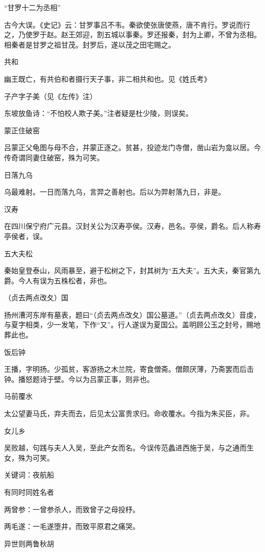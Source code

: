 \documentclass[a4paper,12pt,UTF8,twoside]{ctexbook}
\begin{document}
    “甘罗十二为丞相”
    
    古今大误。《史记》云：甘罗事吕不韦。秦欲使张唐使燕，唐不肯行。罗说而行之，乃使罗于赵。赵王郊迎，割五城以事秦。罗还报秦，封为上卿，不曾为丞相。相秦者是甘罗之祖甘茂。封罗后，遂以茂之田宅赐之。
    
    共和
    
    幽王既亡，有共伯和者摄行天子事，非二相共和也。见《姓氏考》
    
    子产字子美（见《左传》注）
    
    东坡放鱼诗：“不怕校人欺子美。”注者疑是杜少陵，则误矣。
    
    蒙正住破窑
    
    吕蒙正父龟图与母不合，并蒙正逐之。贫甚，投迹龙门寺僧，凿山岩为龛以居。今传奇谓同妻住破窑，殊为可笑。
    
    日落九乌
    
    乌最难射。一日而落九乌，言羿之善射也。后以为羿射落九日，非是。
    
    汉寿
    
    在四川保宁府广元县。汉封关公为汉寿亭侯。汉寿，邑名。亭侯，爵名。后人称寿亭侯者，误。
    
    五大夫松
    
    秦始皇登泰山，风雨暴至，避于松树之下，封其树为“五大夫”。五大夫，秦官第九爵。今人有误为五株松者，非也。
    
    （贞去两点改夂）国
    
    扬州漕河东岸有墓表，题曰“（贞去两点改夂）国公墓道。”（贞去两点改夂）音虔，与夏字相类，少一发笔，下作“又”。行人遂误为夏国公。盖明顾公玉之封号，赐地葬此也。
    
    饭后钟
    
    王播，字明扬。少孤贫，客游扬之木兰院，寄食僧斋。僧颇厌薄，乃斋罢而后击钟。播怒题诗于壁。今以为吕蒙正事，则非也。
    
    马前覆水
    
    太公望妻马氏，弃夫而去，后见太公富贵求归。命收覆水。今指为朱买臣，非。
    
    女儿乡
    
    吴败越，句践与夫人入吴，至此产女而名。今误传范蠡进西施于吴，与之通而生女，殊为可笑。
    
    关键词：夜航船
    
    有同时同姓名者
    
    两曾参：一曾参杀人，而致曾子之母投杼。
    
    两毛遂：一毛遂堕井，而致平原君之痛哭。
    
    异世则两鲁秋胡
    
\end{document}
